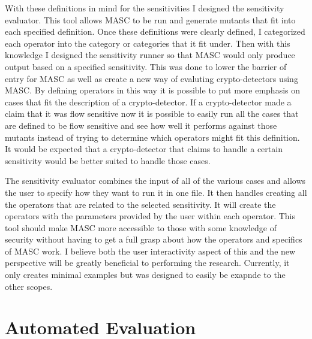 With these definitions in mind for the sensitivities I designed the sensitivity evaluator. This tool allows MASC to be run and generate mutants that fit into each specified definition. Once these definitions were clearly defined, I categorized each operator into the category or categories that it fit under. Then with this knowledge I designed the sensitivity runner so that MASC would only produce output based on a specified sensitivity. This was done to lower the barrier of entry for MASC as well as create a new way of evaluting crypto-detectors using MASC. By defining operators in this way it is possible to put more emphasis on cases that fit the description of a crypto-detector. If a crypto-detector made a claim that it was flow sensitive now it is possible to easily run all the cases that are defined to be flow sensitive and see how well it performs against those mutants instead of trying to determine which operators might fit this definition. It would be expected that a crypto-detector that claims to handle a certain sensitivity would be better suited to handle those cases. 

The sensitivity evaluator combines the input of all of the various cases and allows the user to specify how they want to run it in one file. It then handles creating all the operators that are related to the selected sensitivity. It will create the operators with the parameters provided by the user within each operator. This tool should make MASC more accessible to those with some knowledge of security without having to get a full grasp about how the operators and specifics of MASC work. I believe both the user interactivity aspect of this and the new perspective will be greatly beneficial to performing the research. Currently, it only creates minimal examples but was designed to easily be exapnde to the other scopes.


\section{Automated Evaluation}
\label{ch3:subsec:automation}


